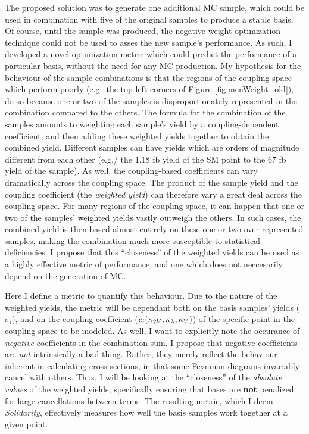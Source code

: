     The proposed solution was to generate one additional MC sample,
        which could be used in combination with five of the original samples to produce a stable basis.
    Of course, until the sample was produced, the negative weight optimization technique could not be used to asses the new sample's performance.
    As such, I developed a novel optimization metric which could predict the performance of a particular basis,
        without the need for any MC production.
    My hypothesis for the behaviour of the sample combinations is that the regions of the coupling space which perform poorly
        (e.g.\ the top left corners of Figure \ref{fig:mcnWeight_old}),
        do so because one or two of the samples is disproportionately represented in the combination compared to the others.
    The formula for the combination of the samples amounts to weighting each sample's yield by a coupling-dependent coefficient,
        and then adding these weighted yields together to obtain the combined yield.
    Different samples can have yields which are orders of magnitude different from each other
        (e.g./ the 1.18 fb yield of the SM point to the 67 fb yield of the  sample).
    As well, the coupling-based coefficients can vary dramatically across the coupling space.
    The product of the sample yield and the coupling coefficient (the \textit{weighted yield})
        can therefore vary a great deal across the coupling space.
    For many regions of the coupling space, it can happen that one or two of the samples' weighted yields vastly outweigh the others.
    In such cases, the combined yield is then based almost entirely on these one or two over-represented samples,
        making the combination much more susceptible to statistical deficiencies.
    I propose that this ``closeness'' of the weighted yields can be used as a highly effective metric of performance,
        and one which does not neccesarily depend on the generation of MC.

    Here I define a metric to quantify this behaviour.
    Due to the nature of the weighted yields,
        the metric will be dependant both on the basis samples' yields ($\sigma_i$),
        and on the coupling coefficient ($c_i(\kappa_{2V},\kappa_{\lambda},\kappa_{V})$) of the specific point in the coupling space to be modeled.
    As well, I want to explicitly note the occurance of \textit{negative} coefficients in the combination sum.
    I propose that negative coefficients are \textit{not} intrinsically a bad thing.
    Rather, they merely reflect the behaviour inherent in calculating cross-sections,
        in that some Feynman diagrams invariably cancel with others.
    Thus, I will be looking at the ``closeness'' of the \textit{absolute values} of the weighted yields,
        specifically ensuring that bases are \textbf{not} penalized for large cancellations between terms.
    The resulting metric, which I deem \textit{Solidarity}, effectively measures how well the basis samples work together at a given point.

